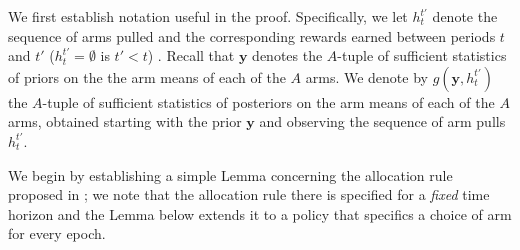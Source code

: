 {\color{blue}
We first establish notation useful in the proof. Specifically, we let $h_t^{t'}$ denote the sequence of arms pulled and the corresponding rewards earned between periods $t$ and $t'$ ($h_t^{t'} = \emptyset$ is $t' < t$) . Recall that $\mathbf y$ denotes the $A$-tuple of sufficient statistics of priors on the the arm means of each of the $A$ arms. We denote by $g(\mathbf y, h_t^{t'})$ the $A$-tuple of sufficient statistics of posteriors on the arm means of each of the $A$ arms, obtained starting with the prior $\mathbf y$ and observing the sequence of arm pulls $h_t^{t'}$. 


We begin by establishing a simple Lemma concerning the allocation rule proposed in \cite{lai1987adaptive}; we note that the allocation rule there is specified for a {\em fixed} time horizon and the Lemma below extends it to a policy that specifics a choice of arm for every epoch. 

}
